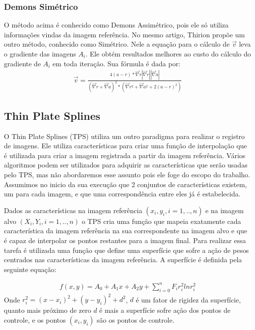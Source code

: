 \documentclass[]{spie}  %
\begin{document}
\subsubsection{Demons Simétrico}
	O método acima é conhecido como Demons Assimétrico, pois ele só utiliza informações vindas
da imagem referência. No mesmo artigo, Thirion propõe um outro método, conhecido como Simétrico.
Nele a equação para o cálculo de $\vec{v}$ leva o gradiente das imagens $A_i$. Ele obtém resultados
melhores ao custo do cálculo do gradiente de $A_i$ em toda iteração. Sua fórmula é dada por:
\begin{align}
	\vec{v} = \frac{4(a - r)*\vec{\nabla}r|\vec{\nabla}r||\vec{\nabla}a|}
					{(\vec{\nabla}r+\vec{\nabla}a)^2*(\vec{\nabla}r^2 + \vec{\nabla}a^2 + 2(a - r)^2)}
\end{align}

\subsection{Thin Plate Splines}
	O Thin Plate Splines (TPS) utiliza um outro paradigma para realizar o registro de imagens. Ele utiliza
características para criar uma função de interpolação que é utilizada para criar a imagem registrada a partir
da imagem referência. Vários algoritmos podem ser utilizados para adquirir as características que serão usadas
pelo TPS, mas não abordaremos esse assunto pois ele foge do escopo do trabalho. Assumimos no inicio da sua
execução que 2 conjuntos de características existem, um para cada imagem, e que uma correspondência entre
eles já é estabelecida.

	Dados as características na imagem referência $(x_i,y_i, i=1,..,n)$ e na imagem alvo $(X_i,Y_i, i=1,..,n)$
o TPS cria uma função que mapeia exatamente cada característica da imagem referência na sua
correspondente na imagem alvo e que é capaz de interpolar os pontos restantes para a imagem final. Para realizar
essa tarefa é utilizada uma função que define uma superfície que sofre a ação de pesos centrados nas
características da imagem referência. A superfície é definida pela seguinte equação\cite{bookstein1989principal}:

\begin{align}
	f(x,y) = A_0 + A_1x + A_2y + \sum_{i=0}^n F_i r_i^2 ln r_i^2
\end{align}
Onde $r_i^2 = (x-x_i)^2 + (y-y_i)^2 + d^2$, $d$ é um fator de rigidez da superfície, quanto mais próximo de 
zero $d$ é mais a superfície sofre ação dos pontos de controle, e os pontos $(x_i, y_i)$ são os pontos de controle.
\end{document}
